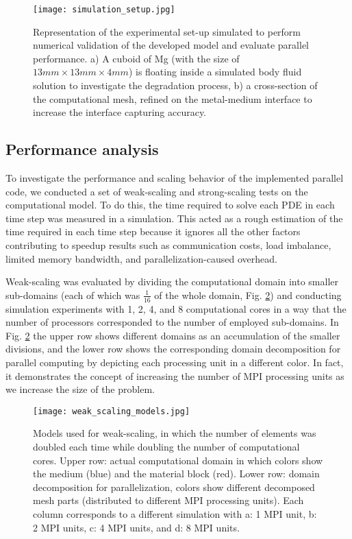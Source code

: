 \begin{figure}[h]
\centering
\medskip
\texttt{[image: simulation\_setup.jpg]}
\caption[Simulation setup for evaluating parallel performance]{Representation of the experimental set-up simulated  to perform numerical validation of the developed model and evaluate parallel performance. a) A cuboid of Mg (with the size of $13mm \times 13mm \times 4 mm$) is floating inside a simulated body fluid solution to investigate the degradation process, b) a cross-section of the computational mesh, refined on the metal-medium interface to increase the interface capturing accuracy.} \label{fig:simulation_setup_parallel}
\end{figure}


\subsection{Performance analysis}

To investigate the performance and scaling behavior of the implemented parallel code, we conducted a set of weak-scaling and strong-scaling tests on the computational model. To do this, the time required to solve each \gls{PDE} in each time step was measured in a simulation. This acted as a rough estimation of the time required in each time step because it ignores all the other factors contributing to speedup results such as communication costs, load imbalance, limited memory bandwidth, and parallelization-caused overhead.

Weak-scaling was evaluated by dividing the computational domain into smaller sub-domains (each of which was $\frac{1}{16}$ of the whole domain, Fig. \ref{fig:weak_scaling_models}) and conducting simulation experiments with 1, 2, 4, and 8 computational cores in  a way  that the number of processors corresponded to the number of employed sub-domains. In Fig. \ref{fig:weak_scaling_models} the upper row shows different domains as an accumulation of the smaller divisions, and the lower row shows the corresponding domain decomposition for parallel computing by depicting each processing unit in a different color. In fact, it demonstrates the concept of increasing the number of \gls{MPI} processing units as we increase the size of the problem.

\begin{figure}[h]
\centering
\medskip
\texttt{[image: weak\_scaling\_models.jpg]}
\caption[Models used for performing the weak-scaling test]{Models used for weak-scaling, in which the number of elements was doubled each time while doubling the number of computational cores. Upper row: actual computational domain in which colors show the medium (blue) and the material block (red). Lower row: domain decomposition for parallelization, colors show different decomposed mesh parts (distributed to different \gls{MPI} processing units). Each column corresponds to a different simulation with a: 1 \gls{MPI} unit, b: 2 \gls{MPI} units, c: 4 \gls{MPI} units, and d: 8 \gls{MPI} units.} \label{fig:weak_scaling_models}
\end{figure}

